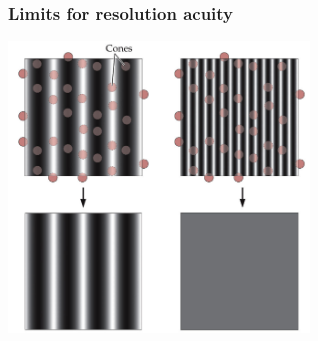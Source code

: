 \documentclass[]{beamer}
\begin{document}
\begin{frame}
\frametitle{Limits for resolution acuity}
  \begin{center}
\includegraphics[width=80mm]{figs/l3/grating_sampling.png}
 \end{center}
\end{frame}
\end{document}
